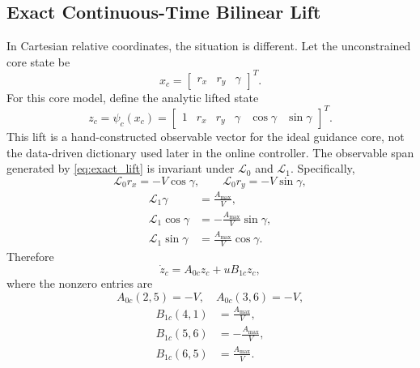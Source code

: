 \documentclass[letterpaper,journal]{IEEEtran}
\begin{document}
\subsection{Exact Continuous-Time Bilinear Lift}
In Cartesian relative coordinates, the situation is different. Let the unconstrained core state be
\begin{equation}
    x_c=\begin{bmatrix}r_x&r_y&\gamma\end{bmatrix}^T .
\end{equation}
For this core model, define the analytic lifted state
\begin{equation}
    z_c=\psi_c(x_c)=
    \begin{bmatrix}
    1&r_x&r_y&\gamma&\cos\gamma&\sin\gamma
    \end{bmatrix}^T .
    \label{eq:exact_lift}
\end{equation}
This lift is a hand-constructed observable vector for the ideal guidance core, not the data-driven dictionary used later in the online controller. The observable span generated by \eqref{eq:exact_lift} is invariant under $\mathcal L_0$ and $\mathcal L_1$. Specifically,
\begin{equation}
    \mathcal L_0 r_x=-V\cos\gamma,\qquad
    \mathcal L_0 r_y=-V\sin\gamma ,
\end{equation}
\begin{equation}
\begin{aligned}
    \mathcal L_1 \gamma&=\frac{A_{\max}}{V},\\
    \mathcal L_1 \cos\gamma&=-\frac{A_{\max}}{V}\sin\gamma,\\
    \mathcal L_1 \sin\gamma&=\frac{A_{\max}}{V}\cos\gamma .
\end{aligned}
\end{equation}
Therefore
\begin{equation}
    \dot z_c=A_{0c}z_c+uB_{1c}z_c ,
    \label{eq:exact_bilinear}
\end{equation}
where the nonzero entries are
\begin{equation}
    A_{0c}(2,5)=-V,\quad A_{0c}(3,6)=-V,
\end{equation}
\begin{equation}
\begin{aligned}
    B_{1c}(4,1)&=\frac{A_{\max}}{V},\\
    B_{1c}(5,6)&=-\frac{A_{\max}}{V},\\
    B_{1c}(6,5)&=\frac{A_{\max}}{V}.
\end{aligned}
\end{equation}
\end{document}
